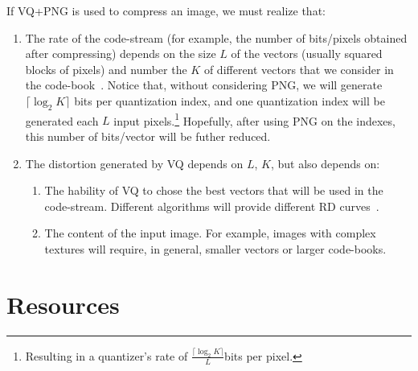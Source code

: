 If VQ+PNG is used to compress an image, we must realize that:
\begin{enumerate}
\item The rate of the code-stream (for example, the number of
  bits/pixels obtained after compressing) depends on the size $L$ of
  the vectors (usually squared blocks of pixels) and number the $K$ of
  different vectors that we consider in the
  code-book~\cite{vruiz__vector_quantization}. Notice that, without
  considering PNG, we will generate $\lceil\log_2 K\rceil$ bits per
  quantization index, and one quantization index will be generated
  each $L$ input pixels.\footnote{Resulting in a quantizer's rate of
  $\frac{\lceil\log_2 K\rceil}{L}$bits per pixel.} Hopefully, after
  using PNG on the indexes, this number of bits/vector will be futher
  reduced.
\item The distortion generated by VQ depends on $L$, $K$, but also
  depends on:
  \begin{enumerate}
  \item The hability of VQ to chose the best vectors that will be used
    in the code-stream. Different algorithms will provide different RD
    curves~\cite{vruiz__information_theory}.
  \item The content of the input image. For example, images with
    complex textures will require, in general, smaller vectors or
    larger code-books.
  \end{enumerate}
\end{enumerate}


\section{Resources}

\renewcommand{\addcontentsline}[3]{} %

